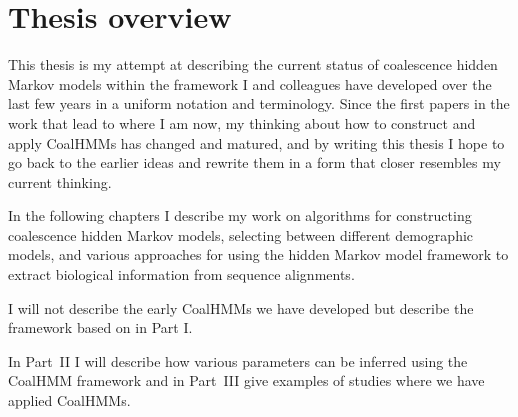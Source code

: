 \section{Thesis overview}

This thesis is my attempt at describing the current status of coalescence hidden Markov models within the framework I and colleagues have developed over the last few years in a uniform notation and terminology. Since the first papers in the work that lead to where I am now, my thinking about how to construct and apply CoalHMMs has changed and matured, and by writing this thesis I hope to go back to the earlier ideas and rewrite them in a form that closer resembles my current thinking.

In the following chapters I describe my work on algorithms for constructing coalescence hidden Markov models, selecting between different demographic models, and various approaches for using the hidden Markov model framework to extract biological information from sequence alignments.

I will not describe the early CoalHMMs we have developed but describe the framework based on \citet{Mailund:2011dv,Mailund:2012ew,springerlink:10.1007/978-3-642-31131-4_3} in Part I.

In Part~II I will describe how various parameters can be inferred using the CoalHMM framework and in Part~III give examples of studies where we have applied CoalHMMs.

